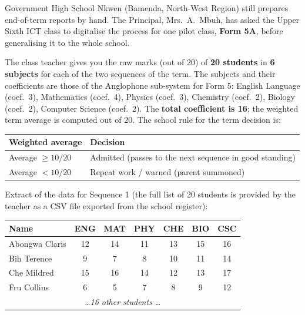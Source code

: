 \documentclass[11pt]{article}
\begin{document}
\begin{experience}
Government High School Nkwen (Bamenda, North-West Region) still prepares end-of-term reports by hand. The Principal, Mrs.\ A.\ Mbuh, has asked the Upper Sixth ICT class to digitalise the process for one pilot class, \textbf{Form 5A}, before generalising it to the whole school.

The class teacher gives you the raw marks (out of 20) of \textbf{20 students} in \textbf{6 subjects} for each of the two sequences of the term. The subjects and their coefficients are those of the Anglophone sub-system for Form 5: English Language (coef.\ 3), Mathematics (coef.\ 4), Physics (coef.\ 3), Chemistry (coef.\ 2), Biology (coef.\ 2), Computer Science (coef.\ 2). The \textbf{total coefficient is 16}; the weighted term average is computed out of 20. The school rule for the term decision is:

\begin{center}
\begin{tabularx}{\linewidth}{|l|X|}
\hline
\rowcolor{popblueL} \textbf{Weighted average} & \textbf{Decision} \\
\hline
Average $\geq 10/20$ & Admitted (passes to the next sequence in good standing) \\
\hline
Average $< 10/20$ & Repeat work / warned (parent summoned) \\
\hline
\end{tabularx}
\end{center}

Extract of the data for Sequence 1 (the full list of 20 students is provided by the teacher as a CSV file exported from the school register):

\begin{center}
\begin{tabular}{|l|c|c|c|c|c|c|}
\hline
\rowcolor{popblueL} \textbf{Name} & \textbf{ENG} & \textbf{MAT} & \textbf{PHY} & \textbf{CHE} & \textbf{BIO} & \textbf{CSC} \\
\hline
Abongwa Claris & 12 & 14 & 11 & 13 & 15 & 16 \\
\hline
Bih Terence & 9 & 7 & 8 & 10 & 11 & 14 \\
\hline
Che Mildred & 15 & 16 & 14 & 12 & 13 & 17 \\
\hline
Fru Collins & 6 & 5 & 7 & 8 & 9 & 12 \\
\hline
\multicolumn{7}{|c|}{\emph{\ldots 16 other students \ldots}} \\
\hline
\end{tabular}
\end{center}


\end{experience}
\end{document}
